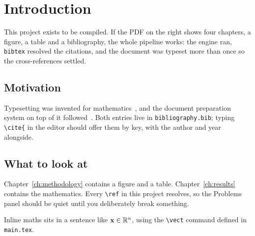\chapter{Introduction}
\label{ch:introduction}

This project exists to be compiled. If the PDF on the right shows four
chapters, a figure, a table and a bibliography, the whole pipeline works:
the engine ran, \texttt{bibtex} resolved the citations, and the document was
typeset more than once so the cross-references settled.

\section{Motivation}
\label{sec:motivation}

Typesetting was invented for mathematics~\cite{knuth1984texbook}, and the
document preparation system on top of it followed~\cite{lamport1994latex}.
Both entries live in \texttt{bibliography.bib}; typing \verb|\cite{| in the
editor should offer them by key, with the author and year alongside.

\section{What to look at}

Chapter~\ref{ch:methodology} contains a figure and a table.
Chapter~\ref{ch:results} contains the mathematics. Every
\verb|\ref| in this project resolves, so the Problems panel should be quiet
until you deliberately break something.

Inline maths sits in a sentence like $\mathbf{x} \in \mathbb{R}^{n}$, using the
\verb|\vect| command defined in \texttt{main.tex}.
